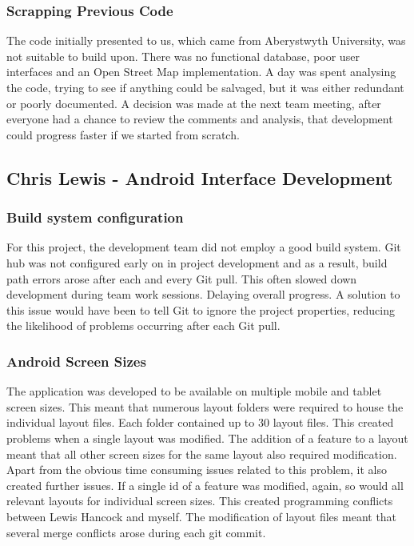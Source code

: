 \documentclass[11pt,a4paper]{report}
\begin{document}
\subsubsection{Scrapping Previous Code}
The code initially presented to us, which came from Aberystwyth University, was not suitable to build upon. There was no functional database, poor user interfaces and an Open Street Map implementation. A day was spent analysing the code, trying to see if anything could be salvaged, but it was either redundant or poorly documented. A decision was made at the next team meeting, after everyone had a chance to review the comments and analysis, that development could progress faster if we started from scratch.

\subsection{Chris Lewis - Android Interface Development}

\subsubsection{Build system configuration}

For this project, the development team did not employ a good build system. Git hub was not configured early on in project development and as a result, build path errors arose after each and every Git pull. This often slowed down development during team work sessions. Delaying overall progress. A solution to this issue would have been to tell Git to ignore the project properties, reducing the likelihood of problems occurring after each Git pull.

\subsubsection{Android Screen Sizes}

The application was developed to be available on multiple mobile and tablet screen sizes. This meant that numerous layout folders were required to house the individual layout files. Each folder contained up to 30 layout files. This created problems when a single layout was modified. The addition of a feature to a layout meant that all other screen sizes for the same layout also required modification. Apart from the obvious time consuming issues related to this problem, it also created further issues. If a single id of a feature was modified, again, so would all relevant layouts for individual screen sizes. This created programming conflicts between Lewis Hancock and myself. The modification of layout files meant that several merge conflicts arose during each git commit.\\
\end{document}
